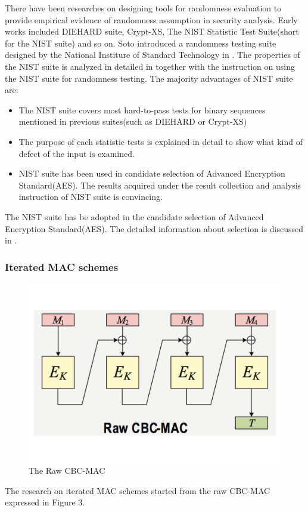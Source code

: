 \documentclass{article}
\begin{document}
There have been researches on designing tools for randomness evaluation to provide empirical evidence of randomness assumption in security analysis.
Early works included DIEHARD suite, Crypt-XS, The NIST
Statistic Test Suite(short for the NIST suite) and so on. Soto introduced a randomness testing suite designed by the National Institure of Standard Technology in \cite{Soto1999}. The properties of the NIST suite is analyzed in detailed in \cite{NIST_suite} together with the instruction on using the NIST suite for randomness testing.
The majority advantages of NIST suite are:
\begin{itemize}
	\item The NIST suite covers most hard-to-pass tests for binary sequences
	mentioned in previous suites(such as DIEHARD or Crypt-XS)
	\item The purpose of each statistic tests is explained in detail to show
	what kind of defect of the input is examined.
	\item NIST suite has been used in candidate selection of Advanced Encryption
	Standard(AES). The results acquired under the result collection and analysis instruction of NIST suite is
	convincing.
\end{itemize}
The NIST suite has be adopted in the candidate selection of Advanced Encryption Standard(AES). The detailed information about selection is discussed in \cite{candidate_test,final_test}. 
\subsubsection{Iterated MAC schemes}
\begin{figure}[htbp]
\centering
\includegraphics[scale=0.3]{./diagram/cbc-mac.pdf}
\caption{The Raw CBC-MAC}
\label{fig: }
\end{figure}
The research on iterated MAC schemes started from the raw CBC-MAC expressed in Figure 3.
\end{document}
